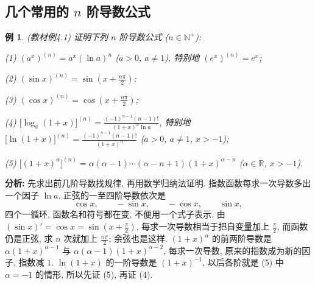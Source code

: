 \documentclass[UTF8,openany]{ctexbook}
\theoremstyle{chinesetextbook}
\newtheorem{example}{例}[section]
\begin{document}
\subsection{\texorpdfstring{几个常用的 $n$ 阶导数公式}{几个常用的 n 阶导数公式}}
\begin{example}\label{ex:c2-4-1}
\textnormal{(教材例4.1)} 证明下列 $n$ 阶导数公式 ($n\in\mathbb N^+$):

(1) $(a^x)^{(n)}=a^x(\ln a)^n$ ($a>0$, $a\ne1$), 特别地 $(e^x)^{(n)}=e^x$;

(2) $\displaystyle(\sin x)^{(n)}=\sin\left(x+\frac{n\pi}2\right)$;

(3) $\displaystyle(\cos x)^{(n)}=\cos\left(x+\frac{n\pi}2\right)$;

(4) $\displaystyle\bigl[\log_a(1+x)\bigr]^{(n)}=\frac{(-1)^{n-1}(n-1)!}{(1+x)^n\ln a}$, 特别地 $\displaystyle\bigl[\ln(1+x)\bigr]^{(n)}=\frac{(-1)^{n-1}(n-1)!}{(1+x)^n}$ ($a>0$, $a\ne1$, $x>-1$);

(5) $\bigl[(1+x)^\alpha\bigr]^{(n)}=\alpha(\alpha-1)\cdots(\alpha-n+1)(1+x)^{\alpha-n}$ ($\alpha\in\mathbb R$, $x>-1$).
\end{example}
\par\indent\textbf{分析:} 先求出前几阶导数找规律, 再用数学归纳法证明. 指数函数每求一次导数多出一个因子 $\ln a$. 正弦的一至四阶导数依次是
\[
\cos x,\qquad-\sin x,\qquad-\cos x,\qquad\sin x,
\]
四个一循环, 函数名和符号都在变, 不便用一个式子表示. 由 $\displaystyle(\sin x)'=\cos x=\sin\left(x+\frac\pi2\right)$, 每求一次导数相当于把自变量加上 $\displaystyle\frac\pi2$, 而函数仍是正弦, 求 $n$ 次就加上 $\displaystyle\frac{n\pi}2$; 余弦也是这样. $(1+x)^\alpha$ 的前两阶导数是 $\alpha(1+x)^{\alpha-1}$ 与 $\alpha(\alpha-1)(1+x)^{\alpha-2}$, 每求一次导数, 原来的指数成为新的因子, 指数减 $1$. $\ln(1+x)$ 的一阶导数是 $(1+x)^{-1}$, 以后各阶就是 (5) 中 $\alpha=-1$ 的情形, 所以先证 (5), 再证 (4).
\end{document}
